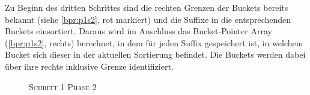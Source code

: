 Zu Beginn des dritten Schrittes sind die rechten Grenzen der Buckets bereits bekannt (siehe \cref{bpr:p1s2}, rot markiert) und die Suffixe in die entsprechenden Buckets einsortiert. Daraus wird im Anschluss das Bucket-Pointer Array (\cref{bpr:p1s2}, rechts)  berechnet, in dem für jeden Suffix gespeichert ist, in welchem Bucket sich dieser in der aktuellen Sortierung befindet. Die Buckets werden dabei über ihre rechte inklusive Grenze identifiziert.
\begin{figure}[H]
    {\centering\begin{minipage}{\textwidth}
        {\large \textsc{Schritt 1}} \hfill {\Large \textsc{Phase 2}}\par\medskip
        \hfill
        \\

\end{minipage}}
\end{figure}
